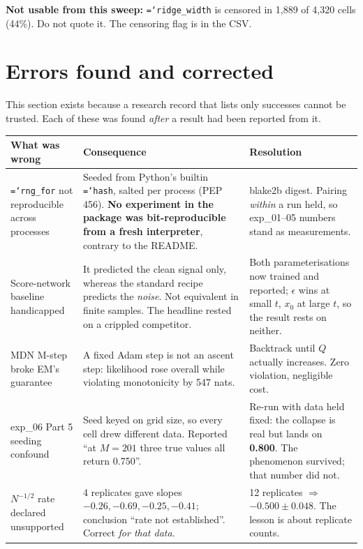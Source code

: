 \documentclass[11pt,a4paper]{article}
\newcommand{\code}[1]{\texttt{\small\hyphenchar\font=`\-\relax #1}}
\begin{document}
\begin{keybox}
\textbf{Not usable from this sweep:} \code{ridge\_width} is censored in 1{,}889 of 4{,}320
cells (44\%). Do not quote it. The censoring flag is in the CSV.
\end{keybox}

\newpage
\section{Errors found and corrected}
\label{sec:corrections}

This section exists because a research record that lists only successes cannot be trusted.
Each of these was found \emph{after} a result had been reported from it.

\begin{center}
\small
\begin{longtable}{@{}p{4.3cm}p{6.4cm}p{4.2cm}@{}}
\toprule
\textbf{What was wrong} & \textbf{Consequence} & \textbf{Resolution} \\
\midrule
\endhead
\code{rng\_for} not reproducible across processes & Seeded from Python's builtin \code{hash}, salted per process (PEP 456). \textbf{No experiment in the package was bit-reproducible from a fresh interpreter}, contrary to the README. & blake2b digest. Pairing \emph{within} a run held, so exp\_01--05 numbers stand as measurements. \\
\addlinespace
Score-network baseline handicapped & It predicted the clean signal only, whereas the standard recipe predicts the \emph{noise}. Not equivalent in finite samples. The headline rested on a crippled competitor. & Both parameterisations now trained and reported; $\epsilon$ wins at small $t$, $x_0$ at large $t$, so the result rests on neither. \\
\addlinespace
MDN M-step broke EM's guarantee & A fixed Adam step is not an ascent step: likelihood rose overall while violating monotonicity by 547 nats. & Backtrack until $Q$ actually increases. Zero violation, negligible cost. \\
\addlinespace
exp\_06 Part 5 seeding confound & Seed keyed on grid size, so every cell drew different data. Reported ``at $M=201$ three true values all return 0.750''. & Re-run with data held fixed: the collapse is real but lands on \textbf{0.800}. The phenomenon survived; that number did not. \\
\addlinespace
$N^{-1/2}$ rate declared unsupported & 4 replicates gave slopes $-0.26,-0.69,-0.25,-0.41$; conclusion ``rate not established''. Correct \emph{for that data}. & 12 replicates $\Rightarrow$ $-0.500\pm0.048$. The lesson is about replicate counts. \\

\end{longtable}
\end{center}
\end{document}
